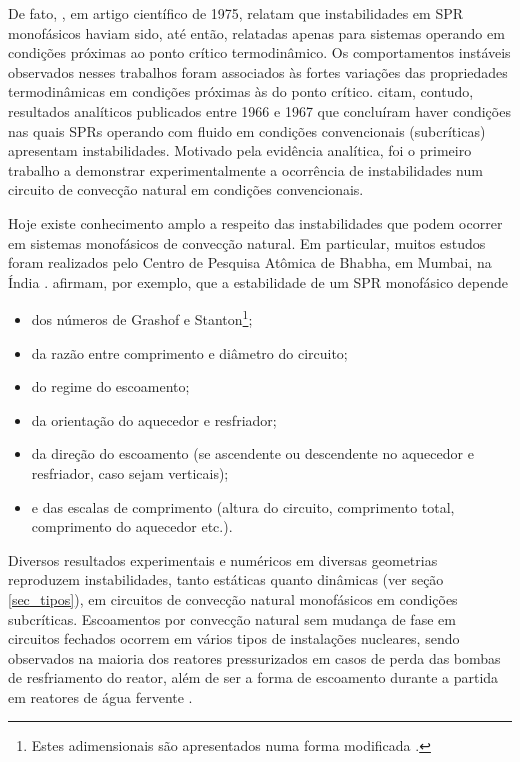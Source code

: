 \documentclass[a4paper,portuguese,10pt]{article}
\begin{document}
De fato, \citet{CREVELING75}, em artigo científico de 1975, relatam que instabilidades em SPR monofásicos haviam sido, até então, relatadas apenas para sistemas operando em condições próximas ao ponto crítico termodinâmico. Os comportamentos instáveis observados nesses trabalhos foram associados às fortes variações das propriedades termodinâmicas em condições próximas às do ponto crítico. \citet{CREVELING75} citam, contudo, resultados analíticos publicados entre 1966 e 1967 que concluíram haver condições nas quais SPRs operando com fluido em condições convencionais (subcríticas) apresentam instabilidades. Motivado pela evidência analítica, \citet{CREVELING75} foi o primeiro trabalho a demonstrar experimentalmente a ocorrência de instabilidades num circuito de convecção natural em condições convencionais.

Hoje existe conhecimento amplo a respeito das instabilidades que podem ocorrer em sistemas monofásicos de convecção natural. Em particular, muitos estudos foram realizados pelo Centro de Pesquisa Atômica de Bhabha, em Mumbai, na Índia \cite{VIJAYAN94,NAYAK95,VIJAYAN07,VIJAYAN08,VIJAYAN10}. \citet{VIJAYAN07} afirmam, por exemplo, que a estabilidade de um SPR monofásico depende 

\begin{itemize}
\item dos números de Grashof e Stanton\footnote{Estes adimensionais são apresentados numa forma modificada \cite{VIJAYAN07}.};
\item da razão entre comprimento e diâmetro do circuito;
\item do regime do escoamento;
\item da orientação do aquecedor e resfriador;
\item da direção do escoamento (se ascendente ou descendente no aquecedor e resfriador, caso sejam verticais);
\item e das escalas de comprimento (altura do circuito, comprimento total, comprimento do aquecedor etc.).
\end{itemize}

Diversos resultados experimentais e numéricos em diversas geometrias reproduzem instabilidades, tanto estáticas quanto dinâmicas (ver seção \ref{sec_tipos}), em circuitos de convecção natural monofásicos em condições subcríticas. Escoamentos por convecção natural sem mudança de fase em circuitos fechados ocorrem em vários tipos de instalações nucleares, sendo observados na maioria dos reatores pressurizados em casos de perda das bombas de resfriamento do reator, além de ser a forma de escoamento durante a partida em reatores de água fervente \cite{VIJAYAN05b}.
\end{document}
